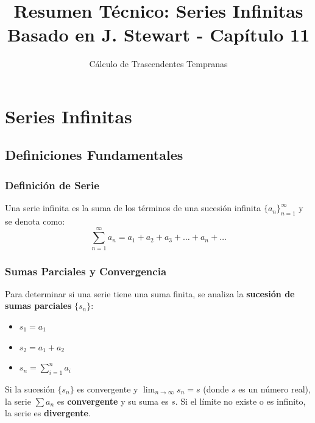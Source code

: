 \documentclass[a4paper,12pt]{article}
\title{\textbf{Resumen Técnico: Series Infinitas}\\ \large Basado en J. Stewart - Capítulo 11}
\author{Cálculo de Trascendentes Tempranas}
\date{}
\begin{document}
\maketitle
\section{Series Infinitas}

\subsection{Definiciones Fundamentales}

\subsubsection{Definición de Serie}
Una serie infinita es la suma de los términos de una sucesión infinita $\{a_n\}_{n=1}^{\infty}$ y se denota como:
$$\sum_{n=1}^{\infty} a_n = a_1 + a_2 + a_3 + \dots + a_n + \dots$$

\subsubsection{Sumas Parciales y Convergencia}
Para determinar si una serie tiene una suma finita, se analiza la \textbf{sucesión de sumas parciales} $\{s_n\}$:
\begin{itemize}
    \item $s_1 = a_1$
    \item $s_2 = a_1 + a_2$
    \item $s_n = \sum_{i=1}^{n} a_i$
\end{itemize}

\begin{tcolorbox}[title=Definición de Convergencia,colback=blue!5!white,colframe=blue!75!black]
Si la sucesión $\{s_n\}$ es convergente y $\lim_{n \to \infty} s_n = s$ (donde $s$ es un número real), la serie $\sum a_n$ es \textbf{convergente} y su suma es $s$. Si el límite no existe o es infinito, la serie es \textbf{divergente}.
\end{tcolorbox}
\end{document}
